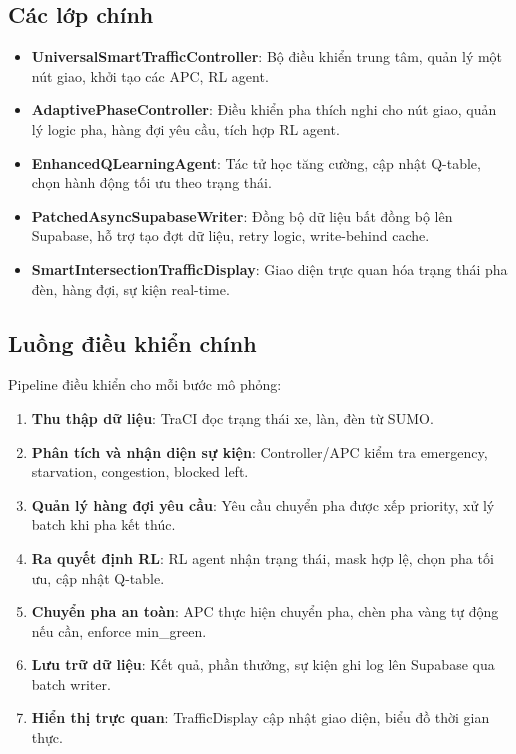 \subsection{Các lớp chính}
\begin{itemize}
    \item \textbf{UniversalSmartTrafficController}: Bộ điều khiển trung tâm, quản lý một nút giao, khởi tạo các APC, RL agent.
    \item \textbf{AdaptivePhaseController}: Điều khiển pha thích nghi cho nút giao, quản lý logic pha, hàng đợi yêu cầu, tích hợp RL agent.
    \item \textbf{EnhancedQLearningAgent}: Tác tử học tăng cường, cập nhật Q-table, chọn hành động tối ưu theo trạng thái.
    \item \textbf{PatchedAsyncSupabaseWriter}: Đồng bộ dữ liệu bất đồng bộ lên Supabase, hỗ trợ tạo đợt dữ liệu, retry logic, write-behind cache.
    \item \textbf{SmartIntersectionTrafficDisplay}: Giao diện trực quan hóa trạng thái pha đèn, hàng đợi, sự kiện real-time.
\end{itemize}


\subsection{Luồng điều khiển chính}

Pipeline điều khiển cho mỗi bước mô phỏng:
\begin{enumerate}
    \item \textbf{Thu thập dữ liệu}: TraCI đọc trạng thái xe, làn, đèn từ SUMO.
    \item \textbf{Phân tích và nhận diện sự kiện}: Controller/APC kiểm tra emergency, starvation, congestion, blocked left.
    \item \textbf{Quản lý hàng đợi yêu cầu}: Yêu cầu chuyển pha được xếp priority, xử lý batch khi pha kết thúc.
    \item \textbf{Ra quyết định RL}: RL agent nhận trạng thái, mask hợp lệ, chọn pha tối ưu, cập nhật Q-table.
    \item \textbf{Chuyển pha an toàn}: APC thực hiện chuyển pha, chèn pha vàng tự động nếu cần, enforce min\_green.
    \item \textbf{Lưu trữ dữ liệu}: Kết quả, phần thưởng, sự kiện ghi log lên Supabase qua batch writer.
    \item \textbf{Hiển thị trực quan}: TrafficDisplay cập nhật giao diện, biểu đồ thời gian thực.
\end{enumerate}

